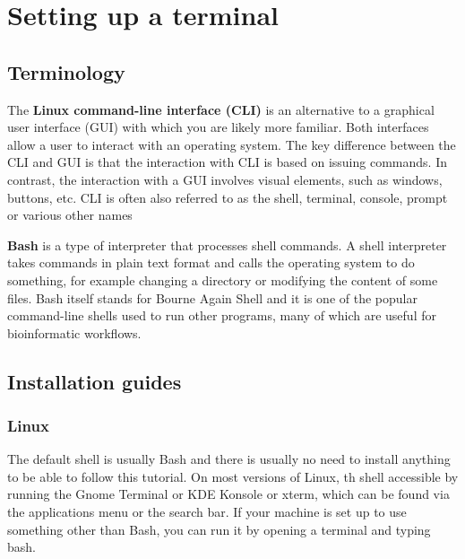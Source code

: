 \documentclass[
  letterpaper,
  DIV=11,
  numbers=noendperiod]{scrreprt}
\author{}
\date{}
\renewcommand*\contentsname{Table of contents}
\newcommand\contentsname{Table of contents}
\begin{document}

\renewcommand*\contentsname{Table of contents}
{
\hypersetup{linkcolor=}
\setcounter{tocdepth}{2}
\tableofcontents
}
\chapter{Setting up a terminal}\label{setting-up-a-terminal}

\section{Terminology}\label{terminology}

The \textbf{Linux command-line interface (CLI)} is an alternative to a
graphical user interface (GUI) with which you are likely more familiar.
Both interfaces allow a user to interact with an operating system. The
key difference between the CLI and GUI is that the interaction with CLI
is based on issuing commands. In contrast, the interaction with a GUI
involves visual elements, such as windows, buttons, etc. CLI is often
also referred to as the shell, terminal, console, prompt or various
other names

\textbf{Bash} is a type of interpreter that processes shell commands. A
shell interpreter takes commands in plain text format and calls the
operating system to do something, for example changing a directory or
modifying the content of some files. Bash itself stands for Bourne Again
Shell and it is one of the popular command-line shells used to run other
programs, many of which are useful for bioinformatic workflows.

\section{Installation guides}\label{installation-guides}

\subsection{Linux}\label{linux}

The default shell is usually Bash and there is usually no need to
install anything to be able to follow this tutorial. On most versions of
Linux, th shell accessible by running the Gnome Terminal or KDE Konsole
or xterm, which can be found via the applications menu or the search
bar. If your machine is set up to use something other than Bash, you can
run it by opening a terminal and typing bash.
\end{document}

